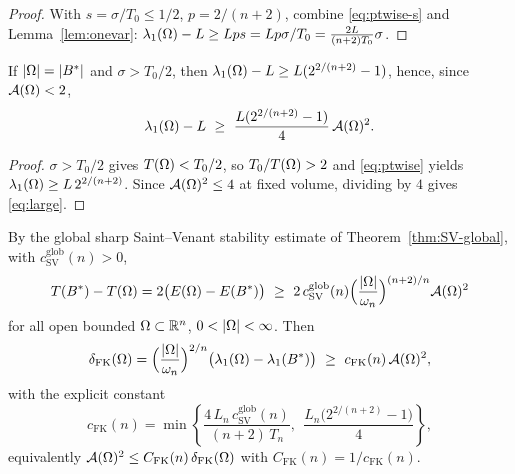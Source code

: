 \begin{proof}
With $s=\sigma/T_0\le1/2$, $p=2/(n+2)$, combine \eqref{eq:ptwise-s} and
Lemma~\ref{lem:onevar}:
$\lambda_1(\Omega)-L\ge Lps=Lp\sigma/T_0=\tfrac{2L}{(n+2)T_0}\sigma$.
\end{proof}

\begin{lemma}\label{lem:large}
If $\left|\Omega\right|=\left|B^*\right|$ and $\sigma>T_0/2$, then
$\lambda_1(\Omega)-L\ge L(2^{2/(n+2)}-1)$, hence, since $\mathcal A(\Omega)<2$,
\begin{equation}\label{eq:large}
  \lambda_1(\Omega)-L\ \ge\ \frac{L(2^{2/(n+2)}-1)}{4}\,\mathcal A(\Omega)^2 .
\end{equation}
\end{lemma}

\begin{proof}
$\sigma>T_0/2$ gives $T(\Omega)<T_0/2$, so $T_0/T(\Omega)>2$ and
\eqref{eq:ptwise} yields $\lambda_1(\Omega)\ge L\,2^{2/(n+2)}$. Since
$\mathcal A(\Omega)^2\le4$ at fixed volume, dividing by $4$ gives \eqref{eq:large}.
\end{proof}

\begin{theorem}\label{thm:fk}
By the global sharp Saint--Venant stability estimate of
Theorem~\ref{thm:SV-global}, with $c_{\mathrm{SV}}^{\mathrm{glob}}(n)>0$,
\begin{equation}\label{eq:sv-input}
  T(B^*)-T(\Omega)=2\bigl(E(\Omega)-E(B^*)\bigr)
  \ \ge\ 2\,c_{\mathrm{SV}}^{\mathrm{glob}}(n)
  \Bigl(\frac{\left|\Omega\right|}{\omega_n}\Bigr)^{(n+2)/n}\mathcal A(\Omega)^2
\end{equation}
for all open bounded $\Omega\subset\mathbb R^n$, $0<\left|\Omega\right|<\infty$. Then
\begin{equation}\label{eq:fk-out}
  \delta_{\mathrm{FK}}(\Omega)
  =\Bigl(\frac{\left|\Omega\right|}{\omega_n}\Bigr)^{2/n}
   \bigl(\lambda_1(\Omega)-\lambda_1(B^*)\bigr)
  \ \ge\ c_{\mathrm{FK}}(n)\,\mathcal A(\Omega)^2,
\end{equation}
with the explicit constant
\begin{equation}\label{eq:cfk}
  c_{\mathrm{FK}}(n)=\min\!\left\{
  \frac{4\,L_n\,c_{\mathrm{SV}}^{\mathrm{glob}}(n)}{(n+2)\,T_n},\ \
  \frac{L_n\bigl(2^{2/(n+2)}-1\bigr)}{4}\right\},
\end{equation}
equivalently $\mathcal A(\Omega)^2\le C_{\mathrm{FK}}(n)\,\delta_{\mathrm{FK}}(\Omega)$
with $C_{\mathrm{FK}}(n)=1/c_{\mathrm{FK}}(n)$.
\end{theorem}

